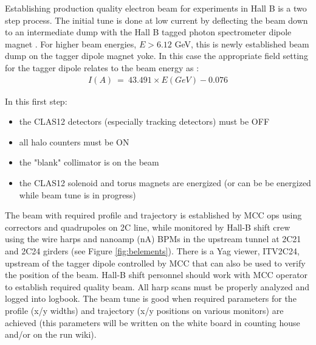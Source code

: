 \indent

Establishing production quality electron beam for experiments in Hall B is a two step process. The initial tune is done at low current by deflecting the beam down to an intermediate dump with the Hall 
B tagged photon spectrometer dipole magnet \cite{tagger}. For higher beam energies, $E>6.12$ GeV, this is newly established beam dump on the tagger dipole magnet yoke. In this case the appropriate field setting for the tagger dipole relates to the beam energy as \cite{yokedump}:
\begin{eqnarray}
I(A)~=~43.491\times E(GeV)-0.076
\end{eqnarray}

In this first step:
\begin{itemize}
\item the CLAS12 detectors (especially tracking detectors) must be OFF 
\item all halo counters must be ON
\item the "blank" collimator is on the beam
\item the CLAS12 solenoid and torus magnets are energized (or can be be energized while beam tune is in progress)
\end{itemize}

The beam with required profile and trajectory is established by MCC ops using correctors and quadrupoles on 2C line, while monitored by Hall-B shift crew using the wire harps and nanoamp (nA) BPMs \cite{nA_BPM} in the upstream tunnel at 2C21 and 2C24 girders (see  Figure \ref{fig:belements}). There is a Yag viewer, ITV2C24, upstream of the tagger dipole controlled by MCC that can also be used to verify the position of the beam. Hall-B shift personnel should work with MCC operator to establish required quality beam. All harp scans must be properly analyzed and logged into logbook. The beam tune is good when required parameters for the profile (x/y widths) and trajectory (x/y positions on various monitors) are achieved (this parameters will be written on the white board in counting house and/or on the run wiki).  

